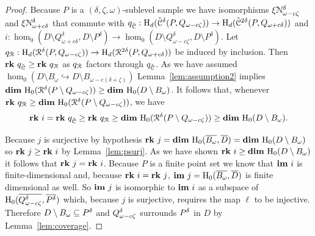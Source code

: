 \begin{proof}

  Because $P$ is a $(\delta, \zeta, \omega)$-sublevel sample we have isomorphisms $\xi\mathcal{N}_{\omega-c\zeta}^\delta$ and $\xi\mathcal{N}_{\omega+c\delta}^\delta$ that commute with $q_{\check{\mathcal{C}}} : \mathrm{H}_d(\check{\mathcal{C}}^{\delta}(P, Q_{\omega-c\zeta}))\to\mathrm{H}_d(\check{\mathcal{C}}^{2\delta}(P, Q_{\omega+c\delta}))$ and $i : \hom_0(D\setminus Q_{\omega+c\delta}^\delta, D\setminus P^\delta)\to \hom_0(D\setminus Q_{\omega-c\zeta}^\delta, D\setminus P^\delta)$.
  Let $q_{\mathcal{R}} : \mathrm{H}_d(\mathcal{R}^{\delta}(P, Q_{\omega-c\zeta}))\to\mathrm{H}_d(\mathcal{R}^{2\delta}(P, Q_{\omega+c\delta}))$ be induced by inclusion.
  Then $\mathbf{rk}~q_{\check{\mathcal{C}}} \geq\mathbf{rk}~q_{\mathcal{R}}$ as $q_{\mathcal{R}}$ factors through $q_{\check{\mathcal{C}}}$.
  As we have assumed $\hom_0(D\setminus B_\omega\hookrightarrow D\setminus B_{\omega-c(\delta+\zeta)})$ Lemma~\ref{lem:assumption2} implies $\mathbf{dim}~\mathrm{H}_0(\mathcal{R}^\delta(P\setminus Q_{\omega-c\zeta}))\geq \mathbf{dim}~\mathrm{H}_0(D\setminus B_\omega)$.
  It follows that, whenever $\mathbf{rk}~q_{\mathcal{R}} \geq \mathbf{dim}~\mathrm{H}_0(\mathcal{R}^\delta(P\setminus Q_{\omega-c\zeta}))$, we have
  \[ \mathbf{rk}~i = \mathbf{rk}~q_{\check{\mathcal{C}}} \geq \mathbf{rk}~q_{\mathcal{R}} \geq \mathbf{dim}~\mathrm{H}_0(\mathcal{R}^\delta(P\setminus Q_{\omega-c\zeta})) \geq \mathbf{dim}~\mathrm{H}_0(D\setminus B_\omega).\]

  Because $j$ is surjective by hypothesis $\mathbf{rk}~j = \mathbf{dim}~\mathrm{H}_0(\overline{B_{\omega}},\overline{D}) = \mathbf{dim}~\mathrm{H}_0(D\setminus B_\omega)$ so $\mathbf{rk}~j\geq \mathbf{rk}~i$ by Lemma~\ref{lem:psurj}.
  As we have shown $\mathbf{rk}~i\geq \mathbf{dim}~\mathrm{H}_0(D\setminus B_\omega)$ it follows that $\mathbf{rk}~j = \mathbf{rk}~i$.
  Because $P$ is a finite point set we know that $\mathbf{im}~i$ is finite-dimensional and, because $\mathbf{rk}~i = \mathbf{rk}~j$, $\mathbf{im}~j=\mathrm{H}_0(\overline{B_{\omega}}, \overline{D})$ is finite dimensional as well.
  So $\mathbf{im}~j$ is isomorphic to $\mathbf{im}~i$ as a subspace of $\mathrm{H}_0(\overline{Q_{\omega - c\zeta}^{\delta}}, \overline{P^{\delta}})$ which, because $j$ is surjective, requires the map $\ell$ to be injective.
  Therefore $D\setminus B_\omega\subseteq P^{\delta}$ and $Q_{\omega - c\zeta}^{\delta}$ surrounds $P^{\delta}$ in $D$ by Lemma~\ref{lem:coverage}.
\end{proof}
